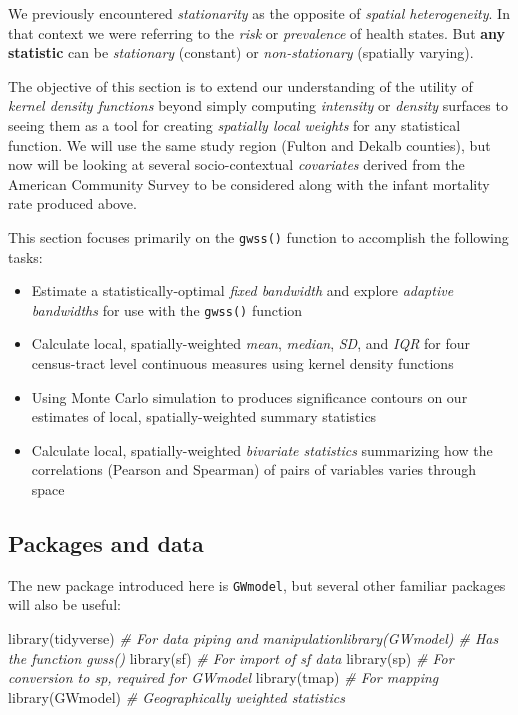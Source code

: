 \documentclass[
]{book}
\newenvironment{Shaded}{\begin{snugshade}}{\end{snugshade}}
\newcommand{\CommentTok}[1]{\textcolor[rgb]{0.56,0.35,0.01}{\textit{#1}}}
\newcommand{\FunctionTok}[1]{\textcolor[rgb]{0.00,0.00,0.00}{#1}}
\newcommand{\NormalTok}[1]{#1}
\providecommand{\tightlist}{%
  \setlength{\itemsep}{0pt}\setlength{\parskip}{0pt}}
\begin{document}
We previously encountered \emph{stationarity} as the opposite of \emph{spatial heterogeneity}. In that context we were referring to the \emph{risk} or \emph{prevalence} of health states. But \textbf{any statistic} can be \emph{stationary} (constant) or \emph{non-stationary} (spatially varying).

The objective of this section is to extend our understanding of the utility of \emph{kernel density functions} beyond simply computing \emph{intensity} or \emph{density} surfaces to seeing them as a tool for creating \emph{spatially local weights} for any statistical function. We will use the same study region (Fulton and Dekalb counties), but now will be looking at several socio-contextual \emph{covariates} derived from the American Community Survey to be considered along with the infant mortality rate produced above.

This section focuses primarily on the \texttt{gwss()} function to accomplish the following tasks:

\begin{itemize}
\tightlist
\item
  Estimate a statistically-optimal \emph{fixed bandwidth} and explore \emph{adaptive bandwidths} for use with the \texttt{gwss()} function
\item
  Calculate local, spatially-weighted \emph{mean}, \emph{median}, \emph{SD}, and \emph{IQR} for four census-tract level continuous measures using kernel density functions
\item
  Using Monte Carlo simulation to produces significance contours on our estimates of local, spatially-weighted summary statistics
\item
  Calculate local, spatially-weighted \emph{bivariate statistics} summarizing how the correlations (Pearson and Spearman) of pairs of variables varies through space
\end{itemize}

\hypertarget{packages-and-data}{%
\subsection{Packages and data}\label{packages-and-data}}

The new package introduced here is \texttt{GWmodel}, but several other familiar packages will also be useful:

\begin{Shaded}
\begin{Highlighting}[]
\FunctionTok{library}\NormalTok{(tidyverse) }\CommentTok{\# For data piping and manipulationlibrary(GWmodel)   \# Has the function gwss() }
\FunctionTok{library}\NormalTok{(sf)        }\CommentTok{\# For import of sf data}
\FunctionTok{library}\NormalTok{(sp)        }\CommentTok{\# For conversion to sp, required for GWmodel}
\FunctionTok{library}\NormalTok{(tmap)      }\CommentTok{\# For mapping}
\FunctionTok{library}\NormalTok{(GWmodel)   }\CommentTok{\# Geographically weighted statistics}
\end{Highlighting}
\end{Shaded}
\end{document}
